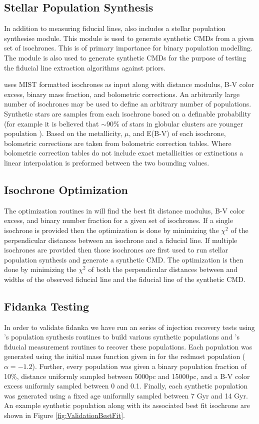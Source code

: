 \subsection{Stellar Population Synthesis}
In addition to measuring fiducial lines, \fidanka also includes a stellar
population synthesise module. This module is used to generate synthetic CMDs
from a given set of isochrones. This is of primary importance for binary
population modelling. The module is also used to generate synthetic CMDs for
the purpose of testing the fiducial line extraction algorithms against priors.

\fidanka uses MIST formatted isochrones \citep{Dotter2016} as input along
with distance modulus, B-V color excess, binary mass fraction, and bolometric
corrections. An arbitrarily large number of isochrones may be used to define an
arbitrary number of populations. Synthetic stars are samples from each
isochrone based on a definable probability (for example it is believed that
$\sim90\%$ of stars in globular clusters are younger population
\citep[e.g.][]{Suntzeff1996, Carretta2013}). Based on the metallicity, $\mu$, and E(B-V) of each
isochrone, bolometric corrections are taken from bolometric correction tables.
Where bolometric correction tables do not include exact metallicities or
extinctions a linear interpolation is preformed between the two bounding
values. 

\subsection{Isochrone Optimization}
The optimization routines in \fidanka will find the best fit distance modulus,
B-V color excess, and binary number fraction for a given set of isochrones. If
a single isochrone is provided then the optimization is done by minimizing the
$\chi^2$ of the perpendicular distances between an isochrone and a fiducial
line. If multiple isochrones are provided then those isochrones are first used
to run stellar population synthesis and generate a synthetic CMD. The
optimization is then done by minimizing the $\chi^2$ of both the perpendicular
distances between and widths of the observed fiducial line and the fiducial
line of the synthetic CMD.


\subsection{Fidanka Testing}
In order to validate fidanka we have run an series of injection recovery tests
using \fidanka's population synthesis routines to build various synthetic
populations and \fidanka's fiducial measurement routines to recover these
populations. Each population was generated using the initial mass function
given in \citep{Milone2012} for the redmost population ($\alpha=-1.2$).
Further, every population was given a binary population fraction of 10\%,
distance uniformly sampled between 5000pc and 15000pc, and a B-V color excess
uniformly sampled between 0 and 0.1. Finally, each synthetic population was
generated using a fixed age  uniformlly sampled between 7 Gyr and 14 Gyr. An
example synthetic population along with its associated best fit isochrone are
shown in Figure \ref{fig:ValidationBestFit}.

